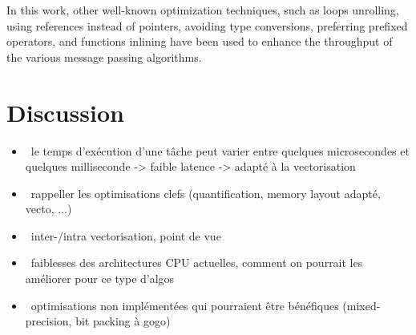 In this work, other well-known optimization techniques, such as loops unrolling,
using references instead of pointers, avoiding type conversions, preferring
prefixed operators, and functions inlining have been used to enhance the
throughput of the various message passing algorithms.

\section{Discussion}

\begin{itemize}
  \item \xmark~le temps d’exécution d’une tâche peut varier entre quelques
    microsecondes et quelques milliseconde -> faible latence -> adapté à la
    vectorisation
  \item \xmark~rappeller les optimisations clefs (quantification, memory layout
    adapté, vecto, ...)
  \item \xmark~inter-/intra vectorisation, point de vue
  \item \xmark~faiblesses des architectures CPU actuelles, comment on pourrait
    les améliorer pour ce type d'algos
  \item \xmark~optimisations non implémentées qui pourraient être bénéfiques
    (mixed-precision, bit packing à gogo)
\end{itemize}